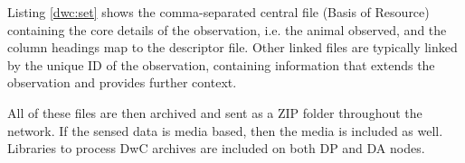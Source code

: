 Listing \ref{dwc:set} shows the comma-separated central file (Basis of Resource) containing the core details of the observation, i.e. the animal observed, and the column headings map to the descriptor file. Other linked files are typically linked by the unique ID of the observation, containing information that extends the observation and provides further context.

\noindent\begin{minipage}{\textwidth}

\end{minipage}



% 


% 


All of these files are then archived and sent as a ZIP folder throughout the network. If the sensed data is media based, then the media is included as well. Libraries to process DwC archives are included on both DP and DA nodes.


